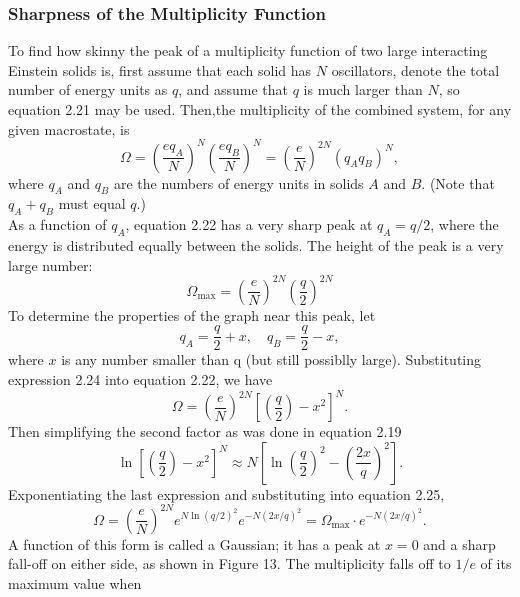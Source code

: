 \documentclass[11pt]{exam}
\begin{document}
\subsubsection*{Sharpness of the Multiplicity Function}
To find how skinny the peak of a multiplicity function of two large interacting Einstein solids is, first assume that each solid has $N$ oscillators, denote the total number of energy units as $q$, and assume that $q$ is much larger than $N$, so equation 2.21 may be used. Then,the multiplicity of the combined system, for any given macrostate, is 
\begin{equation}\tag{2.22}
\Omega = \left(\frac{eq_A}{N}\right)^N\left(\frac{eq_B}{N}\right)^N  = \left(\frac{e}{N}\right)^{2N}(q_Aq_B)^N,
\end{equation}
where $q_A$ and $q_B$ are the numbers of energy units in solids $A$ and $B$. (Note that $q_A +q_B$ must equal $q$.)\\
\hspace*{10mm}As a function of $q_A$, equation 2.22 has a very sharp peak at $q_A = q/2$, where the energy is distributed equally between the solids. The height of the peak is a very large number:
\begin{equation}\tag{2.23}
\Omega_{\text{max}}=\left(\frac{e}{N}\right)^{2N}\left(\frac{q}{2}\right)^{2N}    
\end{equation}
To determine the properties of the graph near this peak, let 
\begin{equation}\tag{2.24}
q_A=\frac{q}{2}+x,\quad q_B=\frac{q}{2}-x,
\end{equation}
where $x$ is any number smaller than q (but still possiblly large). Substituting expression 2.24 into equation 2.22, we have
\begin{equation}\tag{2.25}
\Omega = \left(\frac{e}{N}\right)^{2N}\left[\left(\frac{q}{2}\right)-x^2\right]^N.
\end{equation}
Then simplifying the second factor as was done in equation 2.19
\begin{equation}\tag{2.26}
\ln{\left[\left(\frac{q}{2}\right)-x^2\right]^N} \approx N\left[\ln{\left(\frac{q}{2}\right)^2}-\left(\frac{2x}{q}\right)^2\right].
\end{equation}
Exponentiating the last expression and substituting into equation 2.25, 
\begin{equation}\tag{2.27}
\Omega = \left(\frac{e}{N}\right)^{2N}e^{N\ln{(q/2)}^2}e^{-N(2x/q)^2}=\Omega_{\text{max}}\cdot e^{-N(2x/q)^2}.
\end{equation}
A function of this form is called a Gaussian; it has a peak at $x=0$ and a sharp fall-off on either side, as shown in Figure 13. The multiplicity falls off to $1/e$ of its maximum value when 
\end{document}
